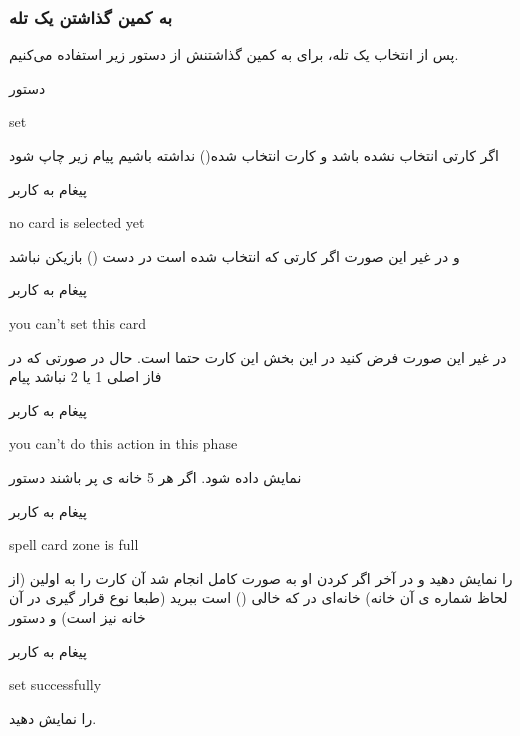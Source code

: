 \documentclass[]{article}
\begin{document}
\subsubsection*{{\titr به کمین گذاشتن یک تله}}
پس از انتخاب یک تله، برای به کمین گذاشتنش از دستور زیر استفاده می‌کنیم.
\begin{mybox}[colback=yellow]{دستور}
	\begin{latin}	
		set 
	\end{latin}
\end{mybox}
اگر کارتی انتخاب نشده باشد و کارت انتخاب شده() نداشته باشیم 
پیام زیر چاپ شود

\begin{mybox}[colback=yellow]{پیغام به کاربر}
	\begin{latin}	
		no card is selected yet
	\end{latin}
\end{mybox}
و در غیر این صورت اگر کارتی که انتخاب شده است در دست () بازیکن 
نباشد
\begin{mybox}[colback=yellow]{پیغام به کاربر}
\begin{latin}	
	you can’t set this card
\end{latin}
\end{mybox}
در غیر این صورت فرض کنید در این بخش این کارت حتما  است. حال در 
صورتی که در فاز اصلی 1 یا 2 نباشد پیام
\begin{mybox}[colback=yellow]{پیغام به کاربر}
\begin{latin}	
	you can’t do this action in this phase
\end{latin}
\end{mybox}
نمایش داده شود. اگر هر 5 خانه ی  پر باشند دستور
\begin{mybox}[colback=yellow]{پیغام به کاربر}
\begin{latin}	
	spell card zone is full	
\end{latin}
\end{mybox}
را نمایش دهید و در آخر اگر  کردن او به صورت کامل انجام شد آن کارت را 
به اولین (از لحاظ شماره ی آن خانه) خانه‌ای در  که خالی 
() است ببرید (طبعا نوع قرار گیری در آن خانه نیز  است) و 
دستور
\begin{mybox}[colback=yellow]{پیغام به کاربر}
\begin{latin}	
	set successfully
\end{latin}
\end{mybox}
را نمایش دهید.
\end{document}

